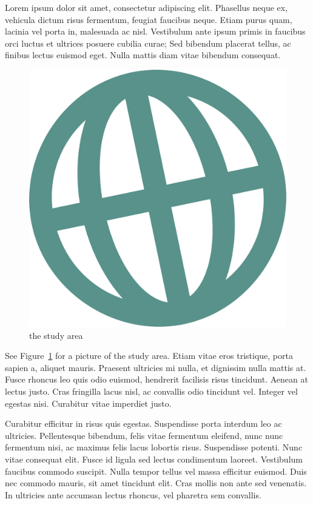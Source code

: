 \documentclass[
  oneside,
  open=any]{scrbook}
\begin{document}
Lorem ipsum dolor sit amet, consectetur adipiscing elit. Phasellus neque
ex, vehicula dictum risus fermentum, feugiat faucibus neque. Etiam purus
quam, lacinia vel porta in, malesuada ac nisl. Vestibulum ante ipsum
primis in faucibus orci luctus et ultrices posuere cubilia curae; Sed
bibendum placerat tellus, ac finibus lectus euismod eget. Nulla mattis
diam vitae bibendum consequat.

\begin{figure}

{\centering \includegraphics{logo.png}

}

\caption{\label{fig-logo}the study area}

\end{figure}

See Figure~\ref{fig-logo} for a picture of the study area. Etiam vitae
eros tristique, porta sapien a, aliquet mauris. Praesent ultricies mi
nulla, et dignissim nulla mattis at. Fusce rhoncus leo quis odio
euismod, hendrerit facilisis risus tincidunt. Aenean at lectus justo.
Cras fringilla lacus nisl, ac convallis odio tincidunt vel. Integer vel
egestas nisi. Curabitur vitae imperdiet justo.

Curabitur efficitur in risus quis egestas. Suspendisse porta interdum
leo ac ultricies. Pellentesque bibendum, felis vitae fermentum eleifend,
nunc nunc fermentum nisi, ac maximus felis lacus lobortis risus.
Suspendisse potenti. Nunc vitae consequat elit. Fusce id ligula sed
lectus condimentum laoreet. Vestibulum faucibus commodo suscipit. Nulla
tempor tellus vel massa efficitur euismod. Duis nec commodo mauris, sit
amet tincidunt elit. Cras mollis non ante sed venenatis. In ultricies
ante accumsan lectus rhoncus, vel pharetra sem convallis.
\end{document}
